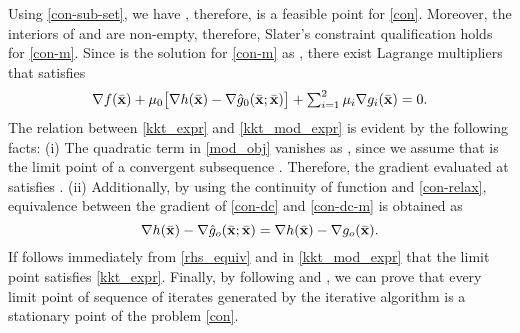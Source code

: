 {Using \eqref{con-sub-set}, we have , therefore, \eqn{\bar{\ma}} is a feasible point for \eqref{con}. Moreover, the interiors of  and  are non-empty, therefore, Slater's constraint qualification holds for \eqref{con-m}. Since \eqn{\bar{\ma}} is the solution for \eqref{con-m} as , there exist Lagrange multipliers  that  satisfies
\begin{equation} \label{kkt_mod_expr}
\textstyle \nabla f(\bar{\ma}) + \mu_0 \big [ \nabla h(\bar{\ma}) - \nabla\hat{g}_0(\bar{\ma};\bar{\ma}) \big ] + \sum_{i=1}^2 \mu_i \nabla g_i(\bar{\ma}) = 0.
\end{equation}
The relation between \eqref{kkt_expr} and \eqref{kkt_mod_expr} is evident by the following facts: (i) The quadratic term  in \eqref{mod_obj} vanishes as , since we assume that \eqn{\bar{\ma}} is the limit point of a convergent subsequence . Therefore, the gradient evaluated at \eqn{\bar{\ma}} satisfies . (ii) Additionally, by using the continuity of function  and \eqref{con-relax}, equivalence between the gradient of \eqref{con-dc} and \eqref{con-dc-m} is obtained as 
\begin{equation} \label{rhs_equiv}
\nabla h(\bar{\ma}) - \nabla \hat{g}_o(\bar{\ma};\bar{\ma}) = \nabla h(\bar{\ma}) - \nabla g_o(\bar{\ma}).
\end{equation}
If follows immediately from \eqref{rhs_equiv} and  in \eqref{kkt_mod_expr} that the limit point \eqn{\bar{\ma}} satisfies \eqref{kkt_expr}. Finally, by following \cite[Thms. 2 and 11]{scutari_1} and \cite[Prop. 3.2]{amir}, we can prove that every limit point of sequence of iterates  generated by the iterative algorithm is a stationary point of the problem \eqref{con}.}










